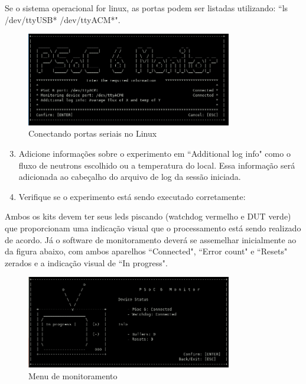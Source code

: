 \documentclass[12pt, a4paper]{article}
\begin{document}
Se o sistema operacional for linux, as portas podem ser listadas utilizando: ``ls /dev/ttyUSB* /dev/ttyACM*".

\begin{figure}[H]
    \centering
    \caption{Conectando portas seriais no Linux}
    \includegraphics[width=0.8\textwidth]{../imgs/serial_linux.png}

    \vspace{0.5em}
    \label{fig:serial_linux}
\end{figure}

\begin{enumerate}[leftmargin=1.3cm]
    \setcounter{enumi}{2}
    \item Adicione informações sobre o experimento em ``Additional log info" como o fluxo de neutrons escolhido ou a temperatura do local. Essa informação será adicionada ao cabeçalho do arquivo de log da sessão iniciada.

    \item Verifique se o experimento está sendo executado corretamente:
\end{enumerate}

Ambos os kits devem ter seus leds piscando (watchdog vermelho e DUT verde) que proporcionam uma indicação visual que o processamento está sendo realizado de acordo. Já o software de monitoramento deverá se assemelhar inicialmente ao da figura abaixo, com ambos aparelhos ``Connected", ``Error count" e ``Resets" zerados e a indicação visual de ``In progress".

\begin{figure}[H]
    \centering
    \caption{Menu de monitoramento}
    \includegraphics[width=0.8\textwidth]{../imgs/monitoring.png}

    \vspace{0.5em}
    \label{fig:monitoring_menu}
\end{figure}
\end{document}
